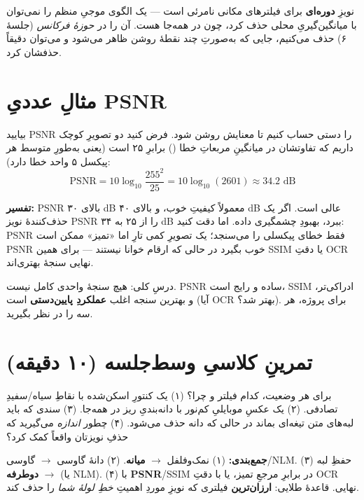 \documentclass[12pt,a4paper]{article}
\begin{document}
\begin{nokte}
نویزِ \textbf{دوره‌ای} برای فیلترهای مکانی نامرئی است — یک الگوی موجیِ منظم را نمی‌توان با
میانگین‌گیریِ محلی حذف کرد، چون در همه‌جا هست. آن را در \emph{حوزهٔ فرکانس} (جلسهٔ ۶) حذف می‌کنیم،
جایی که به‌صورتِ چند نقطهٔ روشن ظاهر می‌شود و می‌توان دقیقاً حذفشان کرد.
\end{nokte}

\section{مثالِ عددیِ PSNR}

بیایید PSNR را دستی حساب کنیم تا معنایش روشن شود. فرض کنید دو تصویرِ کوچک داریم که تفاوتشان در
میانگینِ مربعاتِ خطا () برابرِ ۲۵ است (یعنی به‌طورِ متوسط هر پیکسل ۵ واحد خطا دارد):
\[
\mathrm{PSNR} = 10\log_{10}\frac{255^2}{25} = 10\log_{10}(2601) \approx 34.2 \text{ dB}
\]

\textbf{تفسیر:} PSNRِ بالای ۳۰ dB معمولاً کیفیتِ خوب، و بالای ۴۰ dB عالی است. اگر یک حذف‌کنندهٔ
نویز PSNR را از ۲۵ به ۳۴ dB ببرد، بهبودِ چشمگیری داده. اما دقت کنید: PSNR فقط خطای پیکسلی را
می‌سنجد؛ یک تصویرِ کمی تارِ اما «تمیز» ممکن است PSNRِ خوب بگیرد در حالی که ارقام خوانا نیستند —
برای همین SSIM یا دقتِ OCRِ نهایی سنجهٔ بهتری‌اند.

\begin{yaddasht}
درسِ کلی: هیچ سنجهٔ واحدی کامل نیست. PSNR ساده و رایج است، SSIM ادراکی‌تر، و بهترین سنجه اغلب
\textbf{عملکردِ پایین‌دستی} است (آیا OCR بهتر شد؟). برای پروژه، هر سه را در نظر بگیرید.
\end{yaddasht}

\section{تمرینِ کلاسیِ وسط‌جلسه (۱۰ دقیقه)}

\begin{tamrin}
برای هر وضعیت، کدام فیلتر و چرا؟ (۱) یک کنتورِ اسکن‌شده با نقاطِ سیاه/سفیدِ تصادفی. (۲) یک عکسِ
موبایلیِ کم‌نور با دانه‌بندیِ ریز در همه‌جا. (۳) سندی که باید لبه‌های متن تیغه‌ای بماند در حالی که
دانه حذف می‌شود. (۴) چطور \emph{اندازه} می‌گیرید که حذفِ نویزتان واقعاً کمک کرد؟
\end{tamrin}

\textbf{جمع‌بندی:} (۱) نمک‌وفلفل $\rightarrow$ \textbf{میانه}. (۲) دانهٔ گاوسی $\rightarrow$
گاوسی/NLM. (۳) حفظِ لبه $\rightarrow$ \textbf{دوطرفه} (یا NLM). (۴) با \textbf{PSNR}/SSIM در برابرِ
مرجعِ تمیز، یا با دقتِ OCRِ نهایی. قاعدهٔ طلایی: \textbf{ارزان‌ترین} فیلتری که نویزِ موردِ اهمیتِ
\emph{خطِ لولهٔ شما} را حذف کند.
\end{document}
